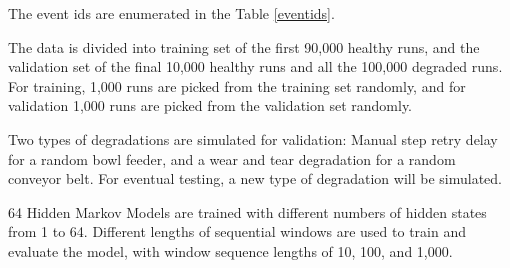 \documentclass[journal]{IEEEtran}
\begin{document}
The event ids are enumerated in the Table \ref{eventids}. 

The data is divided into training set of the first 90,000 healthy runs, and the validation set of the final 10,000 healthy runs and all the 100,000 degraded runs. For training, 1,000 runs are picked from the training set randomly, and for validation 1,000 runs are picked from the validation set randomly.

Two types of degradations are simulated for validation: Manual step retry delay for a random bowl feeder, and a wear and tear degradation for a random conveyor belt. For eventual testing, a new type of degradation will be simulated.

64 Hidden Markov Models are trained with different numbers of hidden states from 1 to 64. Different lengths of sequential windows are used to train and evaluate the model, with window sequence lengths of 10, 100, and 1,000.
\end{document}
